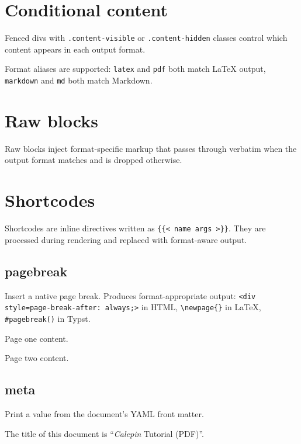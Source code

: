 \documentclass[11pt]{article}
\begin{document}
\section*{Conditional content}
\label{conditional-content}

Fenced divs with \texttt{.content-visible} or \texttt{.content-hidden} classes control which content appears in each output format.



Format aliases are supported: \texttt{latex} and \texttt{pdf} both match LaTeX output, \texttt{markdown} and \texttt{md} both match Markdown.

\section*{Raw blocks}
\label{raw-blocks}

Raw blocks inject format-specific markup that passes through verbatim when the output format matches and is dropped otherwise.



\section*{Shortcodes}
\label{shortcodes}

Shortcodes are inline directives written as \texttt{\{\{\textless{} name args \textgreater{}\}\}}. They are processed during rendering and replaced with format-aware output.

\subsection*{pagebreak}
\label{pagebreak}

Insert a native page break. Produces format-appropriate output: \texttt{\textless{}div style=\textquotedbl{}page-break-after: always;\textquotedbl{}\textgreater{}} in HTML, \texttt{\textbackslash{}newpage\{\}} in LaTeX, \texttt{\#pagebreak()} in Typst.

Page one content.



Page two content.

\subsection*{meta}
\label{meta}

Print a value from the document's YAML front matter.

The title of this document is ``\emph{Calepin} Tutorial (PDF)''.
\end{document}
